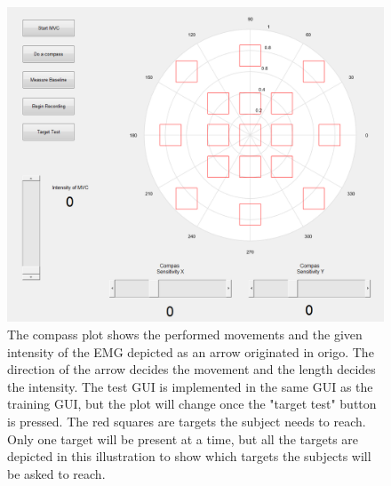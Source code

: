 \begin{figure}[H]
	\includegraphics[width=1\textwidth]{figures/Methods/PlacesToGo.png}  %
	\caption{The compass plot shows the performed movements and the given intensity of the EMG depicted as an arrow originated in origo. The direction of the arrow decides the movement and the length decides the intensity. The test GUI is implemented in the same GUI as the training GUI, but the plot will change once the "target test" button is pressed. The red squares are targets the subject needs to reach. Only one target will be present at a time, but all the targets are depicted in this illustration to show which targets the subjects will be asked to reach.}
	\label{fig:PlacesToGo}
\end{figure}

